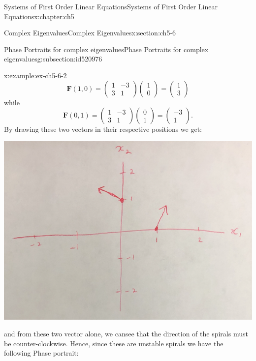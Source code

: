 \documentclass[oneside,10pt,]{book}
\numberwithin{equation}{section}
\numberwithin{equation}{section}
\newcommand{\amp}{&}
\begin{document}
\begin{chapterptx}{Systems of First Order Linear Equations}{}{Systems of First Order Linear Equations}{}{}{x:chapter:ch5}
\begin{sectionptx}{Complex Eigenvalues}{}{Complex Eigenvalues}{}{}{x:section:ch5-6}
\begin{subsectionptx}{Phase Portraits for complex eigenvalues}{}{Phase Portraits for complex eigenvalues}{}{}{g:subsection:id520976}
\begin{example}{}{x:example:ex-ch5-6-2}
\begin{equation*}
\mathbf{F}\left(1,0\right)=\left(\begin{array}{cc}
1 \amp -3\\
3 \amp 1
\end{array}\right)\left(\begin{array}{c}
1\\
0
\end{array}\right)=\left(\begin{array}{c}
1\\
3
\end{array}\right)
\end{equation*}
while%
\begin{equation*}
\mathbf{F}\left(0,1\right)=\left(\begin{array}{cc}
1 \amp -3\\
3 \amp 1
\end{array}\right)\left(\begin{array}{c}
0\\
1
\end{array}\right)=\left(\begin{array}{c}
-3\\
1
\end{array}\right).
\end{equation*}
By drawing these two vectors in their respective positions we get: \begin{image}{0}{1}{0}%
\includegraphics[width=\linewidth]{images/5.6-1c.png}
\end{image}%
 and from these two vector alone, we cansee that the direction of the spirals must be counter-clockwise. Hence, since these are unstable spirals we have the following Phase portrait: \begin{image}{0}{1}{0}%

\end{image}
\end{example}
\end{subsectionptx}
\end{sectionptx}
\end{chapterptx}
\end{document}
